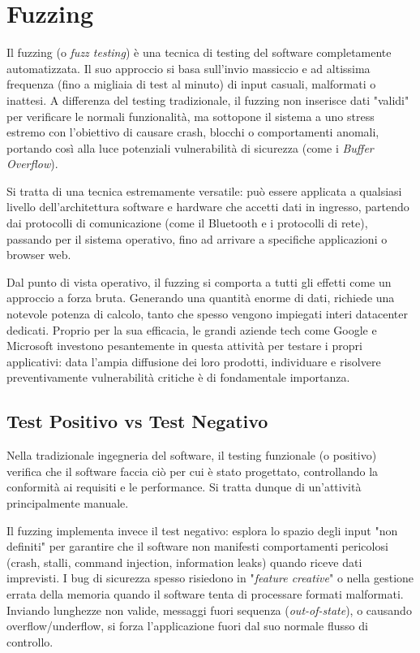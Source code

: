 \chapter{Fuzzing}

Il fuzzing (o \textit{fuzz testing}) è una tecnica di testing del software 
completamente automatizzata. Il suo approccio si basa sull'invio massiccio e ad 
altissima frequenza (fino a migliaia di test al minuto) di input casuali, malformati 
o inattesi. A differenza del testing tradizionale, il fuzzing non inserisce dati 
"validi" per verificare le normali funzionalità, ma sottopone il sistema a uno 
stress estremo con l'obiettivo di causare crash, blocchi o comportamenti anomali, 
portando così alla luce potenziali vulnerabilità di sicurezza (come i \textit{Buffer Overflow}).

Si tratta di una tecnica estremamente versatile: può essere applicata a qualsiasi 
livello dell'architettura software e hardware che accetti dati in ingresso, partendo 
dai protocolli di comunicazione (come il Bluetooth e i protocolli di rete), passando 
per il sistema operativo, fino ad arrivare a specifiche applicazioni o browser web.

Dal punto di vista operativo, il fuzzing si comporta a tutti gli effetti come un 
approccio a forza bruta. Generando una quantità enorme di dati, richiede una 
notevole potenza di calcolo, tanto che spesso vengono impiegati interi datacenter 
dedicati. Proprio per la sua efficacia, le grandi aziende tech come Google e Microsoft 
investono pesantemente in questa attività per testare i propri applicativi: data 
l'ampia diffusione dei loro prodotti, individuare e risolvere preventivamente 
vulnerabilità critiche è di fondamentale importanza.

\section{Test Positivo vs Test Negativo}

Nella tradizionale ingegneria del software, il testing funzionale (o positivo) 
verifica che il software faccia ciò per cui è stato progettato, controllando la 
conformità ai requisiti e le performance. Si tratta dunque di un'attività principalmente
manuale. 

Il fuzzing implementa invece il test negativo: esplora lo spazio degli input "non 
definiti" per garantire che il software non manifesti comportamenti pericolosi 
(crash, stalli, command injection, information leaks) quando riceve dati imprevisti.
I bug di sicurezza spesso risiedono in "\textit{feature creative}" o nella gestione 
errata della memoria quando il software tenta di processare formati malformati. 
Inviando lunghezze non valide, messaggi fuori sequenza (\textit{out-of-state}), o causando 
overflow/underflow, si forza l'applicazione fuori dal suo normale flusso di controllo.

